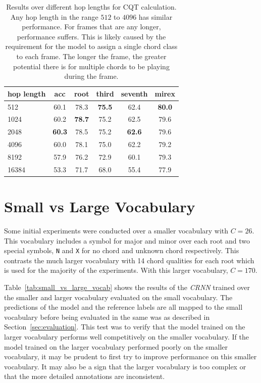 \begin{table}[h]
    \centering
    \begin{tabular}{lccccc}
        \toprule
        hop length & acc & root & third & seventh & mirex \\  
        \midrule
        512 & 60.1 & 78.3 & \textbf{75.5} & 62.4 & \textbf{80.0} \\
        1024 & 60.2 & \textbf{78.7} & 75.2 & 62.5 & 79.6 \\
        2048 & \textbf{60.3} & 78.5 & 75.2 & \textbf{62.6} & 79.6 \\
        4096 & 60.0 & 78.1 & 75.0 & 62.2 & 79.2 \\
        8192 & 57.9 & 76.2 & 72.9 & 60.1 & 79.3 \\
        16384 & 53.3 & 71.7 & 68.0 & 55.4 & 77.9 \\
        \bottomrule
    \end{tabular}
    \caption{Results over different hop lengths for CQT calculation. Any hop length in the range $512$ to $4096$ has similar performance. For frames that are any longer, performance suffers. This is likely caused by the requirement for the model to assign a single chord class to each frame. The longer the frame, the greater potential there is for multiple chords to be playing during the frame. }\label{tab:hop_lengths}
\end{table}


\section{Small vs Large Vocabulary}\label{app:small_vs_large_vocabulary}

Some initial experiments were conducted over a smaller vocabulary with $C=26$. This vocabulary includes a symbol for major and minor over each root and two special symbols, \texttt{N} and \texttt{X} for no chord and unknown chord respectively. This contrasts the much larger vocabulary with 14 chord qualities for each root which is used for the majority of the experiments. With this larger vocabulary, $C=170$.

Table~\ref{tab:small_vs_large_vocab} shows the results of the \emph{CRNN} trained over the smaller and larger vocabulary evaluated on the small vocabulary. The predictions of the model and the reference labels are all mapped to the small vocabulary before being evaluated in the same was as described in Section~\ref{sec:evaluation}. This test was to verify that the model trained on the larger vocabulary performs well competitively on the smaller vocabulary. If the model trained on the larger vocabulary performed poorly on the smaller vocabulary, it may be prudent to first try to improve performance on this smaller vocabulary. It may also be a sign that the larger vocabulary is too complex or that the more detailed annotations are inconsistent.


